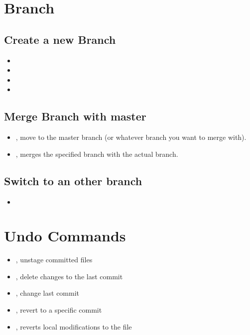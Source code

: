 \section{Branch}
\subsection{Create a new Branch}
\begin{itemize}
\item {}
\item {}
\item {}
\item {}
\end{itemize}

\subsection{Merge Branch with master}
\begin{itemize}
\item {}, move to the master branch (or whatever branch you want to merge with).
\item {}, merges the specified branch with the actual branch.
\end{itemize}

\subsection{Switch to an other branch}
\begin{itemize}
\item {}
\end{itemize}

\section{Undo Commands}
\begin{itemize}
\item {}, unstage committed files
\item {}, delete changes to the last commit
\item {}, change last commit
\item {}, revert to a specific commit
\item {}, reverts local modifications to the file
\end{itemize}

